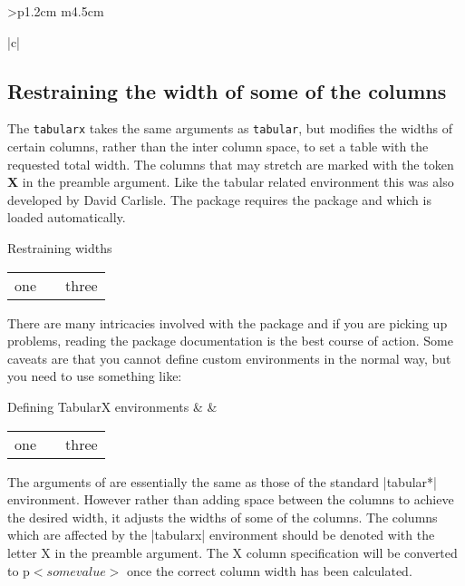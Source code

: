 \begin{tabular}{>{\bfseries}p{1.2cm} m{4.5cm}}
\begin{tabular}[t]{|c|}
\subsection{Restraining the width of some of the columns}

The \texttt{tabularx} takes the same arguments as \texttt{tabular}, but modifies the widths of certain columns, rather than
the inter column space, to set a table with the requested total width. The
columns that may stretch are marked with the token \textbf{X} in the preamble argument. Like the tabular related environment this was also developed by David Carlisle. The package requires the  package and which is loaded automatically.

\begin{texexample}{Restraining widths}{}
\begin{tabularx}{\linewidth-3cm}{|c|X|c|}
   one & \lipsum[1] &three \\
\end{tabularx}
\end{texexample}

There are many intricacies involved with the package and if you are picking up problems, reading the package documentation is the best course of action. Some caveats are that you cannot define custom environments in the normal way, but you need to use something like:

\begin{teXXX}
\newenvironment{foo}{\tabularx{XX}}{\endtabularx}
\end{teXXX}

\begin{texexample}{Defining TabularX environments}{}
\newenvironment{XXX}{
}{
\endtabularx}
\begin{XXX}
\lorem & \lorem &\lorem\\
\end{XXX}
\end{texexample}


{\scriptsize
\begin{tabularx}{\linewidth}{|c|X|c|}
one & \lorem\lorem &three\\
\end{tabularx}
}



The arguments of  are essentially the same as those of the standard
|tabular*| environment. However rather than adding space between the columns
to achieve the desired width, it adjusts the widths of some of the columns. The
columns which are affected by the |tabularx| environment should be denoted with
the letter X in the preamble argument. The X column specification will be converted
to p{$<some value>$} once the correct column width has been calculated.


\end{tabular}
\end{tabular}
